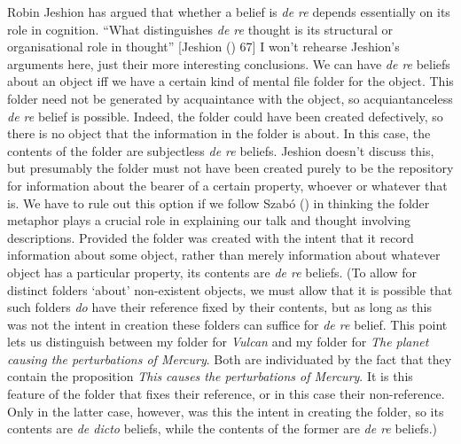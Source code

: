 \documentclass[
  11pt,
  letterpaper,
  DIV=11,
  numbers=noendperiod,
  oneside]{scrartcl}
\begin{document}
Robin Jeshion has argued that whether a belief is \emph{de re} depends
essentially on its role in cognition. ``What distinguishes \emph{de re}
thought is its structural or organisational role in thought'' {[}Jeshion
() 67{]} I won't rehearse Jeshion's
arguments here, just their more interesting conclusions. We can have
\emph{de re} beliefs about an object iff we have a certain kind of
mental file folder for the object. This folder need not be generated by
acquaintance with the object, so acquiantanceless \emph{de re} belief is
possible. Indeed, the folder could have been created defectively, so
there is no object that the information in the folder is
about. In this
case, the contents of the folder are subjectless \emph{de re} beliefs.
Jeshion doesn't discuss this, but presumably the folder must not have
been created purely to be the repository for information about the
bearer of a certain property, whoever or whatever that is. We have to
rule out this option if we follow Szabó ()
in thinking the folder metaphor plays a crucial role in explaining our
talk and thought involving descriptions. Provided the folder was created
with the intent that it record information about some object, rather
than merely information about whatever object has a particular property,
its contents are \emph{de re} beliefs. (To allow for distinct folders
`about' non-existent objects, we must allow that it is possible that
such folders \emph{do} have their reference fixed by their contents, but
as long as this was not the intent in creation these folders can suffice
for \emph{de re} belief. This point lets us distinguish between my
folder for \emph{Vulcan} and my folder for \emph{The planet causing the
perturbations of Mercury}. Both are individuated by the fact that they
contain the proposition \emph{This} \emph{causes the perturbations of
Mercury}. It is this feature of the folder that fixes their reference,
or in this case their non-reference. Only in the latter case, however,
was this the intent in creating the folder, so its contents are \emph{de
dicto} beliefs, while the contents of the former are \emph{de re}
beliefs.)
\end{document}
